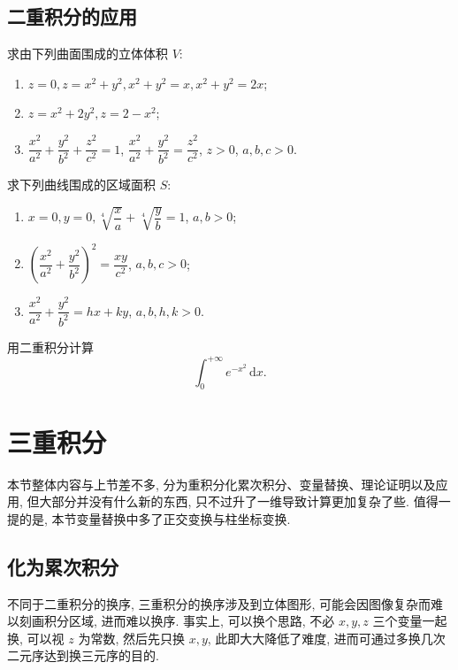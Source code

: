 \documentclass[../../数学分析培优讲义.tex]{subfiles}
\begin{document}
\subsection{二重积分的应用}

\begin{example}
求由下列曲面围成的立体体积 $V$:
\begin{enumerate}[label=(\arabic*)]
    \item $z=0,z=x^2+y^2,x^2+y^2=x,x^2+y^2=2x$;
    \item $z=x^2+2y^2,z=2-x^2$;
    \item $\dfrac{x^2}{a^2}+\dfrac{y^2}{b^2}+\dfrac{z^2}{c^2}=1$, $\dfrac{x^2}{a^2}+\dfrac{y^2}{b^2}=\dfrac{z^2}{c^2}$, $z>0$, $a,b,c>0$.
\end{enumerate}
\end{example}
\exampleblank

\begin{example}
求下列曲线围成的区域面积 $S$:
\begin{enumerate}[label=(\arabic*)]
    \item $x=0,y=0,\sqrt[4]{\dfrac{x}{a}}+\sqrt[4]{\dfrac{y}{b}}=1$, $a,b>0$;
    \item $\left(\dfrac{x^2}{a^2}+\dfrac{y^2}{b^2}\right)^2=\dfrac{xy}{c^2}$, $a,b,c>0$;
    \item $\dfrac{x^2}{a^2}+\dfrac{y^2}{b^2}=hx+ky$, $a,b,h,k>0$.
\end{enumerate}
\end{example}
\exampleblank

\begin{example}[\markstar]
用二重积分计算
\[
    \int_0^{+\infty}e^{-x^2}\,\mathrm{d}x.
\]
\end{example}
\exampleblank


\newpage

\section{三重积分}

本节整体内容与上节差不多, 分为重积分化累次积分、变量替换、理论证明以及应用, 但大部分并没有什么新的东西, 只不过升了一维导致计算更加复杂了些. 值得一提的是, 本节变量替换中多了正交变换与柱坐标变换.



\subsection{化为累次积分}

不同于二重积分的换序, 三重积分的换序涉及到立体图形, 可能会因图像复杂而难以刻画积分区域, 进而难以换序. 事实上, 可以换个思路, 不必 $x,y,z$ 三个变量一起换, 可以视 $z$ 为常数, 然后先只换 $x,y$, 此即大大降低了难度, 进而可通过多换几次二元序达到换三元序的目的.
\end{document}
